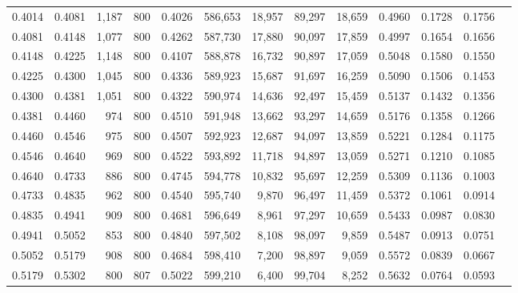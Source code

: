 \begin{tabular}{rrrrrrrrrrrrr}
0.4014 & 0.4081 &  1,187 &   800 &                                     0.4026 & 586,653 &  18,957 &  89,297 &  18,659 & 0.4960 & 0.1728 & 0.1756 \\
0.4081 & 0.4148 &  1,077 &   800 &                                     0.4262 & 587,730 &  17,880 &  90,097 &  17,859 & 0.4997 & 0.1654 & 0.1656 \\
0.4148 & 0.4225 &  1,148 &   800 &                                     0.4107 & 588,878 &  16,732 &  90,897 &  17,059 & 0.5048 & 0.1580 & 0.1550 \\
0.4225 & 0.4300 &  1,045 &   800 &                                     0.4336 & 589,923 &  15,687 &  91,697 &  16,259 & 0.5090 & 0.1506 & 0.1453 \\
0.4300 & 0.4381 &  1,051 &   800 &                                     0.4322 & 590,974 &  14,636 &  92,497 &  15,459 & 0.5137 & 0.1432 & 0.1356 \\
0.4381 & 0.4460 &    974 &   800 &                                     0.4510 & 591,948 &  13,662 &  93,297 &  14,659 & 0.5176 & 0.1358 & 0.1266 \\
0.4460 & 0.4546 &    975 &   800 &                                     0.4507 & 592,923 &  12,687 &  94,097 &  13,859 & 0.5221 & 0.1284 & 0.1175 \\
0.4546 & 0.4640 &    969 &   800 &                                     0.4522 & 593,892 &  11,718 &  94,897 &  13,059 & 0.5271 & 0.1210 & 0.1085 \\
0.4640 & 0.4733 &    886 &   800 &                                     0.4745 & 594,778 &  10,832 &  95,697 &  12,259 & 0.5309 & 0.1136 & 0.1003 \\
0.4733 & 0.4835 &    962 &   800 &                                     0.4540 & 595,740 &   9,870 &  96,497 &  11,459 & 0.5372 & 0.1061 & 0.0914 \\
0.4835 & 0.4941 &    909 &   800 &                                     0.4681 & 596,649 &   8,961 &  97,297 &  10,659 & 0.5433 & 0.0987 & 0.0830 \\
0.4941 & 0.5052 &    853 &   800 &                                     0.4840 & 597,502 &   8,108 &  98,097 &   9,859 & 0.5487 & 0.0913 & 0.0751 \\
0.5052 & 0.5179 &    908 &   800 &                                     0.4684 & 598,410 &   7,200 &  98,897 &   9,059 & 0.5572 & 0.0839 & 0.0667 \\
0.5179 & 0.5302 &    800 &   807 &                                     0.5022 & 599,210 &   6,400 &  99,704 &   8,252 & 0.5632 & 0.0764 & 0.0593 \\

\end{tabular}
